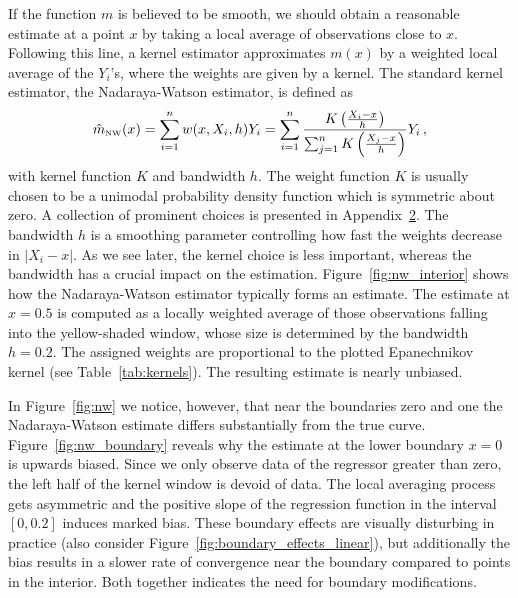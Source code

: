 If the function $m$ is believed to be smooth, we should obtain a reasonable estimate at a point $x$ by taking a local average of observations close to $x$.
Following this line, a kernel estimator approximates $m(x)$ by a weighted local average of the $Y_i$'s, where the weights are given by a kernel.
The standard kernel estimator, the Nadaraya-Watson estimator, is defined as
\begin{equation} \label{eq:nw}
	\hat{m}_{\textup{\tiny NW}}(x) = \sum_{i = 1}^{n} w(x, X_i, h) Y_i =
	\sum_{i = 1}^{n} \frac{K \left( \frac{X_i - x}{h} \right)}{\sum_{j = 1}^{n} K \left( \frac{X_j - x}{h} \right)} Y_i \,, 
\end{equation}
with kernel function $K$ and bandwidth $h$.
The weight function $K$ is usually chosen to be a unimodal probability density function which is symmetric about zero.
A collection of prominent choices is presented in Appendix~\hyperref[appendix_2]{2}.
The bandwidth $h$ is a smoothing parameter controlling how fast the weights decrease in $|X_i - x|$.
As we see later, the kernel choice is less important, whereas the bandwidth has a crucial impact on the estimation.
Figure~\ref{fig:nw_interior} shows how the Nadaraya-Watson estimator typically forms an estimate.
The estimate at $x = 0.5$ is computed as a locally weighted average of those observations falling into the yellow-shaded window, whose size is determined by the bandwidth $h = 0.2$. 
The assigned weights are proportional to the plotted Epanechnikov kernel (see Table~\ref{tab:kernels}).
The resulting estimate is nearly unbiased.

In Figure~\ref{fig:nw} we notice, however, that near the boundaries zero and one the Nadaraya-Watson estimate differs substantially from the true curve.
Figure~\ref{fig:nw_boundary} reveals why the estimate at the lower boundary $x = 0$ is upwards biased.
Since we only observe data of the regressor greater than zero, the left half of the kernel window is devoid of data.
The local averaging process gets asymmetric and the positive slope of the regression function in the interval $[0, 0.2]$ induces marked bias.
These boundary effects are visually disturbing in practice (also consider Figure~\ref{fig:boundary_effects_linear}),
but additionally the bias results in a slower rate of convergence near the boundary compared to points in the interior.
Both together indicates the need for boundary modifications.

